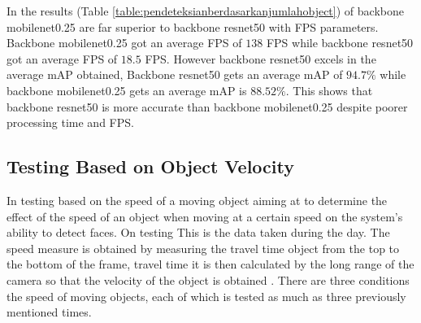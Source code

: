 In the results (Table \ref{table:pendeteksianberdasarkanjumlahobject}) of backbone mobilenet0.25 are far superior to backbone resnet50
with FPS parameters. Backbone mobilenet0.25 got an average FPS of $138$ FPS while backbone resnet50 got an average FPS of $18.5$ FPS. However 
backbone resnet50 excels in the average mAP obtained, Backbone resnet50 gets an average mAP of $94.7\%$ while backbone mobilenet0.25 gets an average
mAP is $88.52\%$. This shows that backbone resnet50 is more accurate than backbone mobilenet0.25 despite poorer processing time and FPS.

\subsection{Testing Based on Object Velocity}

In testing based on the speed of a moving object aiming at
to determine the effect of the speed of an object when moving at a certain speed on
the system's ability to detect faces. On testing
This is the data taken during the day.
The speed measure is obtained by measuring the travel time
object from the top to the bottom of the frame, travel time
it is then calculated by the long range of the camera
so that the velocity of the object is obtained \citep{nugrohoevalution2016}. There are three conditions
the speed of moving objects, each of which is tested as much as three
previously mentioned times.

